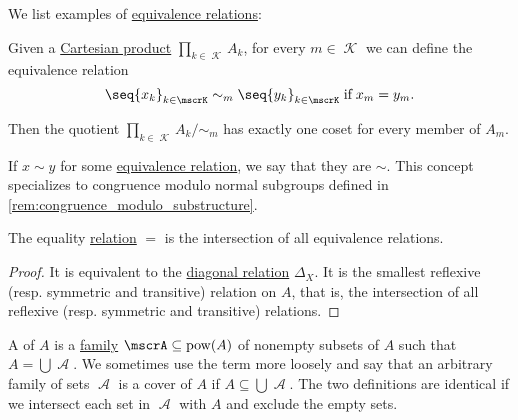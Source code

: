 \begin{example}\label{ex:def:equivalence_relation}
  We list examples of \hyperref[def:equivalence_relation]{equivalence relations}:
  \begin{thmenum}
     Given a \hyperref[def:cartesian_product]{Cartesian product} \( \prod_{k \in \mscrK} A_k \), for every \( m \in \mscrK \) we can define the equivalence relation
    \begin{equation*}
       \seq{ x_k }_{k \in \mscrK} \sim_m \seq{ y_k }_{k \in \mscrK} \T{if} x_m = y_m.
    \end{equation*}

    Then the quotient \(\prod_{k \in \mscrK} A_k / {\sim_m} \) has exactly one coset for every member of \( A_m \).
  \end{thmenum}
\end{example}

\begin{concept}\label{con:congruence_modulo_relation}
  If \( x \sim y \) for some \hyperref[def:equivalence_relation]{equivalence relation}, we say that they are  \( \sim \). This concept specializes to congruence modulo normal subgroups defined in \cref{rem:congruence_modulo_substructure}.
\end{concept}

\begin{proposition}\label{thm:equality_is_smallest_equivalence_relation}
  The equality \hyperref[def:binary_relation]{relation} \( = \) is the intersection of all equivalence relations.
\end{proposition}
\begin{proof}
  It is equivalent to the \hyperref[def:binary_relation/diagonal]{diagonal relation} \( \Delta_X \). It is the smallest reflexive (resp. symmetric and transitive) relation on \( A \), that is, the intersection of all reflexive (resp. symmetric and transitive) relations.
\end{proof}

\begin{definition}\label{def:set_cover}
  A  of \( A \) is a \hyperref[rem:family_of_sets]{family} \( \mscrA \subseteq \pow(A) \) of nonempty subsets of \( A \) such that \( A = \bigcup \mscrA \). We sometimes use the term more loosely and say that an arbitrary family of sets \( \mscrA \) is a cover of \( A \) if \( A \subseteq \bigcup \mscrA \). The two definitions are identical if we intersect each set in \( \mscrA \) with \( A \) and exclude the empty sets.
\end{definition}

